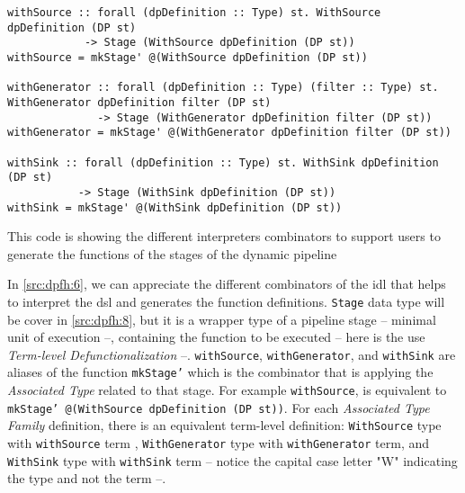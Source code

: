 \begin{listing}[H]
  \begin{verbatim}
withSource :: forall (dpDefinition :: Type) st. WithSource dpDefinition (DP st) 
            -> Stage (WithSource dpDefinition (DP st))
withSource = mkStage' @(WithSource dpDefinition (DP st))

withGenerator :: forall (dpDefinition :: Type) (filter :: Type) st. WithGenerator dpDefinition filter (DP st) 
              -> Stage (WithGenerator dpDefinition filter (DP st))
withGenerator = mkStage' @(WithGenerator dpDefinition filter (DP st))

withSink :: forall (dpDefinition :: Type) st. WithSink dpDefinition (DP st) 
           -> Stage (WithSink dpDefinition (DP st))
withSink = mkStage' @(WithSink dpDefinition (DP st))
  \end{verbatim}
  \caption[{[\texttt{Stage.hs}] Using with Interpreters of \acrshort{dp} encoded in $G_{dsl}$}]{This code is showing the different interpreters combinators to support users to generate the functions of the stages of the dynamic pipeline}
  \label{src:dpfh:6}
\end{listing}

In \autoref{src:dpfh:6}, we can appreciate the different combinators of the \acrshort{idl} that helps to interpret the \acrshort{dsl} and generates the function definitions.
\texttt{Stage} data type will be cover in \autoref{src:dpfh:8}, but it is a wrapper type of a pipeline stage -- minimal unit of execution --, containing the function to be executed -- here is the use \emph{Term-level Defunctionalization} --.
\texttt{withSource}, \texttt{withGenerator}, and \texttt{withSink} are aliases of the function \texttt{mkStage'} which is the combinator that is applying the \emph{Associated Type} related to that stage. For example \texttt{withSource}, is equivalent to \texttt{mkStage' @(WithSource dpDefinition (DP st))}.
For each \emph{Associated Type Family} definition, there is an equivalent term-level definition: \texttt{WithSource} type with \texttt{withSource} term , \texttt{WithGenerator} type with \texttt{withGenerator} term, and \texttt{WithSink} type with \texttt{withSink} term -- notice the capital case letter "W" indicating the type and not the term --.

